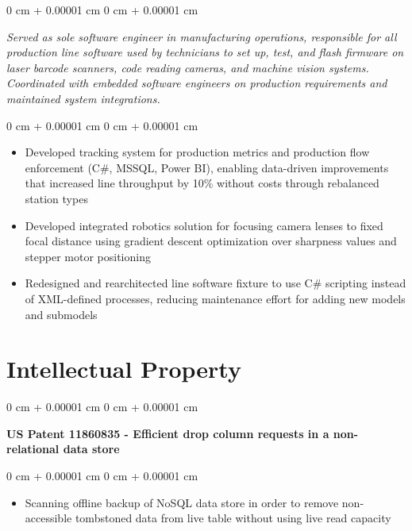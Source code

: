 \documentclass[10pt, letterpaper]{article}
\newenvironment{highlights}{
    \begin{itemize}[
        topsep=0.10 cm,
        parsep=0.10 cm,
        partopsep=0pt,
        itemsep=0pt,
        leftmargin=0 cm + 10pt
    ]
}{
    \end{itemize}
} %
\newenvironment{onecolentry}{
    \begin{adjustwidth}{
        0 cm + 0.00001 cm
    }{
        0 cm + 0.00001 cm
    }
}{
    \end{adjustwidth}
} %
\newenvironment{twocolentry}[2][]{
    \onecolentry
    \def\secondColumn{#2}
    \setcolumnwidth{\fill, 4.5 cm}
    \begin{paracol}{2}
}{
    \switchcolumn \raggedleft \secondColumn
    \end{paracol}
    \endonecolentry
} %
\begin{document}
        \vspace{0.05 cm}
        \begin{onecolentry}
            \textit{Served as sole software engineer in manufacturing operations, responsible for all production line software used by technicians to set up, test, and flash firmware on laser barcode scanners, code reading cameras, and machine vision systems. Coordinated with embedded software engineers on production requirements and maintained system integrations.}
        \end{onecolentry}

        \vspace{0.05 cm}
        \begin{onecolentry}
            \begin{highlights}
                \item Developed tracking system for production metrics and production flow enforcement (C\#, MSSQL, Power BI), enabling data-driven improvements that increased line throughput by 10\% without costs through rebalanced station types
                \item Developed integrated robotics solution for focusing camera lenses to fixed focal distance using gradient descent optimization over sharpness values and stepper motor positioning
                \item Redesigned and rearchitected line software fixture to use C\# scripting instead of XML-defined processes, reducing maintenance effort for adding new models and submodels
            \end{highlights}
        \end{onecolentry}

    
    \section{Intellectual Property}

        \begin{samepage}
            \begin{twocolentry}{
            
            }
                \textbf{US Patent 11860835 - Efficient drop column requests in a non-relational data store}
            \end{twocolentry}

            \vspace{0.10 cm}
            
            \begin{onecolentry}
                \begin{highlights}
                    \item Scanning offline backup of NoSQL data store in order to remove non-accessible tombstoned data from live table without using live read capacity
                \end{highlights}
            \end{onecolentry}
        \end{samepage}
\end{document}
